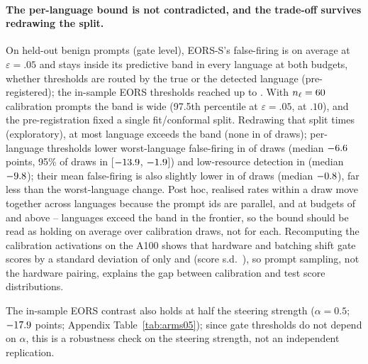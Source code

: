 \documentclass{article}
\begin{document}
\paragraph{The per-language bound is not contradicted, and the trade-off survives redrawing the split.} On held-out benign prompts (gate level), EORS-S's false-firing is \CtlFiveValidMeanFpr{} on average at $\varepsilon{=}.05$ and stays inside its predictive band in every language at both budgets, whether thresholds are routed by the true or the detected language (pre-registered); the in-sample EORS thresholds reached up to \CtlFiveInsampleMaxFpr. With $n_\ell=60$ calibration prompts the band is wide (97.5th percentile \CtlFiveBand{} at $\varepsilon{=}.05$, \CtlTenBand{} at $.10$), and the pre-registration fixed a single fit/conformal split. Redrawing that split \CtlSplitN{} times (exploratory), at most \CtlSplitAboveMax{} language exceeds the band (none in \CtlSplitAboveZero{} of draws); per-language thresholds lower worst-language false-firing in \CtlSplitDMaxShare{} of draws (median $-6.6$ points, 95\% of draws in [$-13.9$, $-1.9$]) and low-resource detection in \CtlSplitDLrlShare{} (median $-9.8$); their mean false-firing is also slightly lower in \CtlSplitMeanLowerShare{} of draws (median $-0.8$), far less than the worst-language change. Post hoc, realised rates within a draw move together across languages because the prompt ids are parallel, and at budgets of \CtlFrontExceedEps{} and above \CtlFrontExceedMin--\CtlFrontExceedMax{} languages exceed the band in the frontier, so the bound should be read as holding on average over calibration draws, not for each. Recomputing the calibration activations on the A100 shows that hardware and batching shift gate scores by a standard deviation of only \CtlHwSd{} and \CtlBatchSd{} (score s.d.\ \CtlScoreSd), so prompt sampling, not the hardware pairing, explains the gap between calibration and test score distributions.

The in-sample EORS contrast also holds at half the steering strength ($\alpha{=}0.5$; $-17.9$ points; Appendix Table~\ref{tab:arms05}); since gate thresholds do not depend on $\alpha$, this is a robustness check on the steering strength, not an independent replication.

\begin{table}[t]
\caption{\textbf{Matched-budget controls} (pre-registered 2026-10-28; Tiny Aya Earth, A100, $\alpha{=}1$, Qwen3Guard-4B). Top: each arm against the unrepaired model. Bottom: per-language against pooled split-conformal thresholds at the same budget, the pre-registered contrast. Percentage points, 95\% paired bootstrap intervals over prompt ids; low-resource tier: bn, sw, jv.}
\label{tab:controls}
\centering\resizebox{\linewidth}{!}{}
\end{table}
\end{document}
